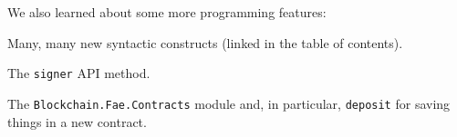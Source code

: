 \documentclass[11pt]{article}
\begin{document}
\vspace{11pt}

We also learned about some more programming features:


\vspace{5.5pt}\begin{longitem}
\item{Many, many new syntactic constructs (linked in the table of contents).}
\item{The \texttt{signer} API method.}
\item{The \texttt{Blockchain.Fae.Contracts} module and, in particular, \texttt{deposit} for saving things in a new contract.  }
\end{longitem}

\vspace{11pt}
\end{document}
